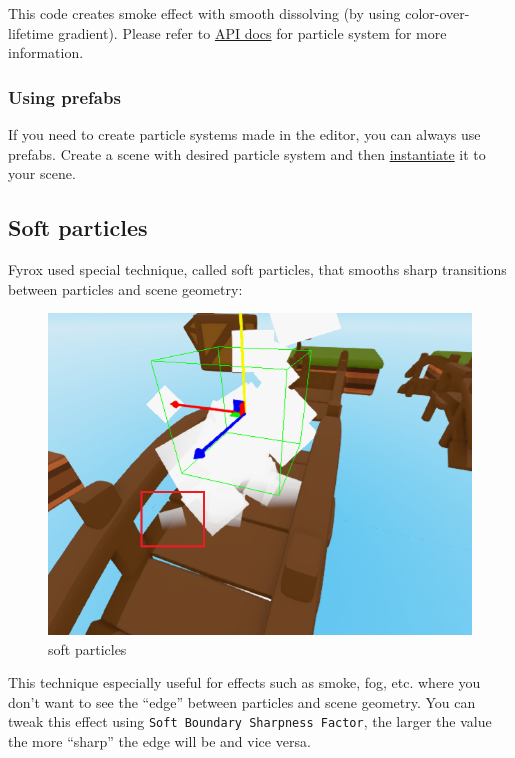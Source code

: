 \documentclass[
]{book}
\theoremstyle{definition}
\theoremstyle{definition}
\theoremstyle{definition}
\theoremstyle{definition}
\theoremstyle{remark}
\begin{document}
This code creates smoke effect with smooth dissolving (by using color-over-lifetime gradient). Please refer to \href{https://docs.rs/fyrox/latest/fyrox/scene/particle_system/index.html}{API docs} for particle system for more information.

\subsubsection{Using prefabs}\label{using-prefabs}

If you need to create particle systems made in the editor, you can always use prefabs. Create a scene with desired particle system and then \href{../resources/model.md\#instantiation}{instantiate} it to your scene.

\subsection{Soft particles}\label{soft-particles}

Fyrox used special technique, called soft particles, that smooths sharp transitions between particles and scene geometry:

\begin{figure}
\centering
\includegraphics{images/scene_soft_particles.png}
\caption{soft particles}
\end{figure}

This technique especially useful for effects such as smoke, fog, etc. where you don't want to see the ``edge'' between particles and scene geometry. You can tweak this effect using \texttt{Soft\ Boundary\ Sharpness\ Factor}, the larger the value the more ``sharp'' the edge will be and vice versa.
\end{document}
